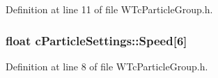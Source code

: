 Definition at line 11 of file WTcParticleGroup.h.

\hypertarget{classc_particle_settings_a52bf5cd5e94039617ba61a42fabf5b05}{
\subsubsection[{Speed}]{\setlength{\rightskip}{0pt plus 5cm}float {\bf cParticleSettings::Speed}\mbox{[}6\mbox{]}}}
\label{classc_particle_settings_a52bf5cd5e94039617ba61a42fabf5b05}


Definition at line 8 of file WTcParticleGroup.h.

